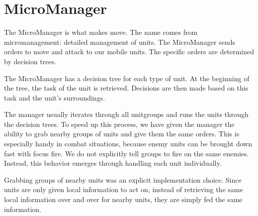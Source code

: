 \section{MicroManager}

The MicroManager is what makes \massexpand move. The name comes from micromanagement: detailed management of units. The MicroManager sends orders to move and attack to our mobile units. The specific orders are determined by decision trees.

The MicroManager has a decision tree for each type of unit. At the beginning of the tree, the task of the unit is retrieved. Decisions are then made based on this task and the unit's surroundings.

The manager usually iterates through all unitgroups and runs the units through the decision trees. To speed up this process, we have given the manager the ability to grab nearby groups of units and give them the same orders. This is especially handy in combat situations, because enemy units can be brought down fast with focus fire. We do not explicitly tell groups to fire on the same enemies. Instead, this behavior emerges through handling each unit individually.

Grabbing groups of nearby units was an explicit implementation choice. Since units are only given local information to act on, instead of retrieving the same local information over and over for nearby units, they are simply fed the same information.